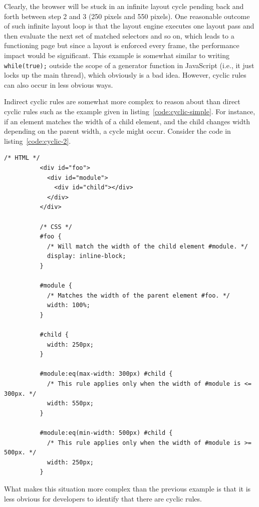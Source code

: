 \documentclass[a4paper,11pt]{kth-mag}
\newcommand{\code}[1]{\texttt{#1}}
\begin{document}
        Clearly, the \gls{browser} will be stuck in an infinite layout cycle pending back and forth between step 2 and 3 (250 pixels and 550 pixels).
        One reasonable outcome of such infinite layout loop is that the \gls{layout engine} executes one layout pass and then evaluate the next set of matched selectors and so on, which leads to a functioning page but since a layout is enforced every frame, the performance impact would be significant.
        This example is somewhat similar to writing \code{while(true);} outside the scope of a generator function in JavaScript (i.e., it just locks up the main thread), which obviously is a bad idea.
        However, cyclic rules can also occur in less obvious ways.

        Indirect cyclic rules are somewhat more complex to reason about than direct cyclic rules such as the example given in listing~\ref{code:cyclic-simple}.
        For instance, if an \gls{element} matches the width of a child \gls{element}, and the child changes width depending on the parent width, a cycle might occur.
        Consider the code in listing~\ref{code:cyclic-2}.
        \begin{lstlisting}[gobble=10,caption={Example of indirect cyclic rules. Here the user (\code{\#foo}) of the module (\code{\#module}) creates cyclic rules indirectly by specifying that it should match the width of the module.}, captionpos=b, label={code:cyclic-2}]
          /* HTML */
          <div id="foo">
            <div id="module">
              <div id="child"></div>
            </div>
          </div>

          /* CSS */
          #foo {
            /* Will match the width of the child element #module. */
            display: inline-block;
          }

          #module {
            /* Matches the width of the parent element #foo. */
            width: 100%;
          }

          #child {
            width: 250px;
          }

          #module:eq(max-width: 300px) #child {
            /* This rule applies only when the width of #module is <= 300px. */
            width: 550px;
          }

          #module:eq(min-width: 500px) #child {
            /* This rule applies only when the width of #module is >= 500px. */
            width: 250px;
          }
        \end{lstlisting}
        What makes this situation more complex than the previous example is that it is less obvious for developers to identify that there are cyclic rules.
\end{document}
